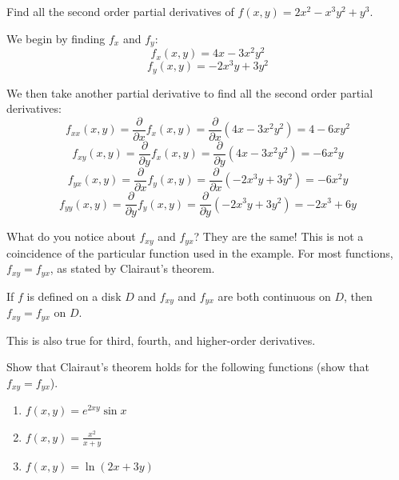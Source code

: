 \begin{Worked}
\begin{Problem}
Find all the second order partial derivatives of $f(x, y) = 
2x^2 - x^3y^2 + y^3$.
\end{Problem}
\begin{Solution}
We begin by finding $f_x$ and $f_y$:
$$f_x(x, y) = 4x - 3x^2y^2$$
$$f_y(x, y) = -2x^3y + 3y^2$$

We then take another partial derivative to find all the second order partial 
derivatives:
$$f_{xx}(x, y) = \frac{\partial}{\partial x}f_x(x, y) = \frac{\partial}{
\partial x} \left( 4x - 3x^2y^2 \right) = 4 - 6xy^2$$
$$f_{xy}(x, y) = \frac{\partial}{\partial y}f_x(x, y) = \frac{\partial}{
\partial y} \left( 4x - 3x^2y^2 \right) = -6x^2y$$
$$f_{yx}(x, y) = \frac{\partial}{\partial x}f_y(x, y) = \frac{\partial}{
\partial x} \left( -2x^3y + 3y^2 \right) = -6x^2y$$
$$f_{yy}(x, y) = \frac{\partial}{\partial y}f_y(x, y) = \frac{\partial}{
\partial y} \left( -2x^3y + 3y^2 \right) = -2x^3 + 6y$$
\end{Solution}
\end{Worked}

What do you notice about $f_{xy}$ and $f_{yx}$? They are the same! This is not 
a coincidence of the particular function used in the example. For most 
functions, $f_{xy} = f_{yx}$, as stated by Clairaut's theorem.

\begin{mdframed}[style = important, frametitle = {Clairaut's Theorem}]
If $f$ is defined on a disk $D$ and $f_{xy}$ and $f_{yx}$ are both continuous 
on $D$, then $f_{xy} = f_{yx}$ on $D$.
\end{mdframed}

This is also true for third, fourth, and higher-order derivatives. 

\begin{Exercise}[title = {Clairaut's Theorem}, label = clairaut]
Show that Clairaut's theorem holds for the following functions (show that 
$f_{xy} = f_{yx}$). 
\begin{enumerate}
    \item $f(x, y) = e^{2xy} \sin{x}$
    \item $f(x, y) = \frac{x^2}{x + y}$
    \item $f(x, y) = \ln{\left( 2x + 3y \right)}$
\end{enumerate}
\end{Exercise}

